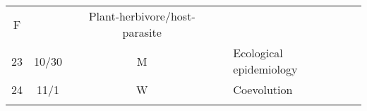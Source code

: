 \documentclass[]{article}
\begin{document}
\begin{longtable}[]{@{}ccclll@{}}
\begin{minipage}[t]{0.07\columnwidth}
F\strut
\end{minipage} & \begin{minipage}[t]{0.10\columnwidth}\raggedright\strut
\strut
\end{minipage} & \begin{minipage}[t]{0.12\columnwidth}\raggedright\strut
Plant-herbivore/host-parasite\strut
\end{minipage} & \begin{minipage}[t]{0.12\columnwidth}\raggedright\strut
\strut
\end{minipage}\tabularnewline
\begin{minipage}[t]{0.13\columnwidth}\centering\strut
23\strut
\end{minipage} & \begin{minipage}[t]{0.08\columnwidth}\centering\strut
10/30\strut
\end{minipage} & \begin{minipage}[t]{0.07\columnwidth}\centering\strut
M\strut
\end{minipage} & \begin{minipage}[t]{0.10\columnwidth}\raggedright\strut
\strut
\end{minipage} & \begin{minipage}[t]{0.12\columnwidth}\raggedright\strut
Ecological epidemiology\strut
\end{minipage} & \begin{minipage}[t]{0.12\columnwidth}\raggedright\strut
\strut
\end{minipage}\tabularnewline
\begin{minipage}[t]{0.13\columnwidth}\centering\strut
24\strut
\end{minipage} & \begin{minipage}[t]{0.08\columnwidth}\centering\strut
11/1\strut
\end{minipage} & \begin{minipage}[t]{0.07\columnwidth}\centering\strut
W\strut
\end{minipage} & \begin{minipage}[t]{0.10\columnwidth}\raggedright\strut
\strut
\end{minipage} & \begin{minipage}[t]{0.12\columnwidth}\raggedright\strut
Coevolution\strut
\end{minipage} & \begin{minipage}[t]{0.12\columnwidth}\raggedright\strut
\strut
\end{minipage}\tabularnewline
\begin{minipage}[t]{0.13\columnwidth}\centering\strut

\end{minipage}
\end{longtable}
\end{document}
